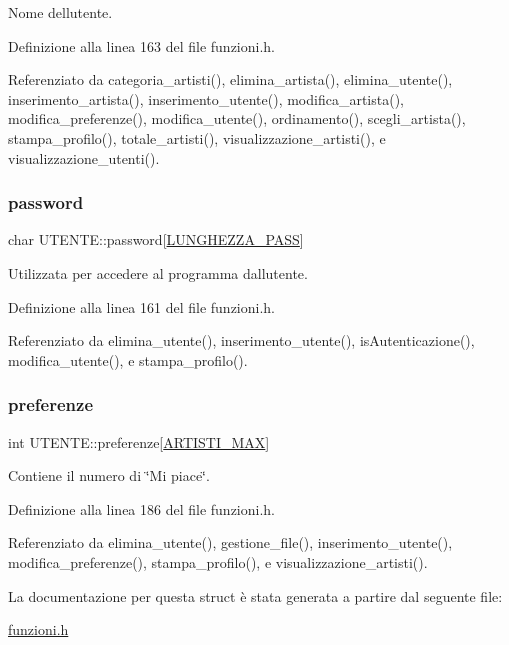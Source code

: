 Nome dell\textquotesingle{}utente. 

Definizione alla linea 163 del file funzioni.\+h.



Referenziato da categoria\+\_\+artisti(), elimina\+\_\+artista(), elimina\+\_\+utente(), inserimento\+\_\+artista(), inserimento\+\_\+utente(), modifica\+\_\+artista(), modifica\+\_\+preferenze(), modifica\+\_\+utente(), ordinamento(), scegli\+\_\+artista(), stampa\+\_\+profilo(), totale\+\_\+artisti(), visualizzazione\+\_\+artisti(), e visualizzazione\+\_\+utenti().

\mbox{\label{struct_u_t_e_n_t_e_a04d8337f5e0fe9cd44d36cbe7dac7415}} 
\subsubsection{\texorpdfstring{password}{password}}
{\footnotesize\ttfamily char U\+T\+E\+N\+T\+E\+::password\mbox{[}\hyperlink{funzioni_8h_a21981b6e8c0f57093d564c3df476f9ee}{L\+U\+N\+G\+H\+E\+Z\+Z\+A\+\_\+\+P\+A\+SS}\mbox{]}}

Utilizzata per accedere al programma dall\textquotesingle{}utente. 

Definizione alla linea 161 del file funzioni.\+h.



Referenziato da elimina\+\_\+utente(), inserimento\+\_\+utente(), is\+Autenticazione(), modifica\+\_\+utente(), e stampa\+\_\+profilo().

\mbox{\label{struct_u_t_e_n_t_e_a1b4dec4c7ed79c12a76501b634b71176}} 
\subsubsection{\texorpdfstring{preferenze}{preferenze}}
{\footnotesize\ttfamily int U\+T\+E\+N\+T\+E\+::preferenze\mbox{[}\hyperlink{funzioni_8h_af17e5297d3cc4c2db33d467698a1b9c2}{A\+R\+T\+I\+S\+T\+I\+\_\+\+M\+AX}\mbox{]}}

Contiene il numero di \char`\"{}\+Mi piace\char`\"{}. 

Definizione alla linea 186 del file funzioni.\+h.



Referenziato da elimina\+\_\+utente(), gestione\+\_\+file(), inserimento\+\_\+utente(), modifica\+\_\+preferenze(), stampa\+\_\+profilo(), e visualizzazione\+\_\+artisti().



La documentazione per questa struct è stata generata a partire dal seguente file\+:\begin{DoxyCompactItemize}
\item 
\hyperlink{funzioni_8h}{funzioni.\+h}\end{DoxyCompactItemize}
